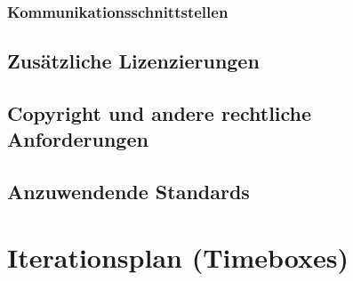 \documentclass[a4paper,12pt,twoside]{scrreprt}
\begin{document}
    \subsection{Kommunikationsschnittstellen}
        
    \section{Zusätzliche Lizenzierungen}
        
    \section{Copyright und andere rechtliche Anforderungen}
        
    \section{Anzuwendende Standards}
        

    \chapter{Iterationsplan (Timeboxes)}
\end{document}
